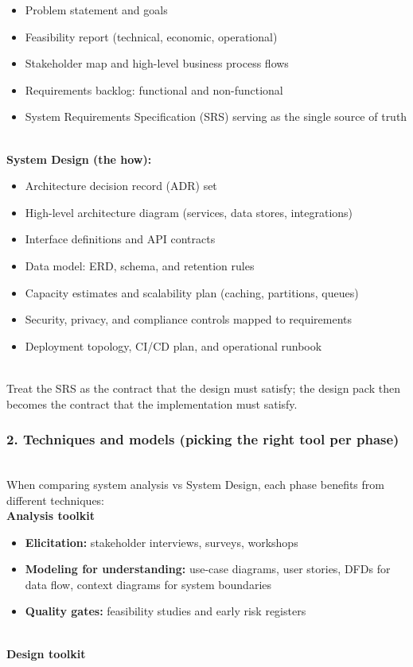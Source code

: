 \begin{itemize}
\item
Problem statement and goals
\item
Feasibility report (technical, economic, operational)
\item
Stakeholder map and high-level business process flows
\item
Requirements backlog: functional and non-functional
\item
System Requirements Specification (SRS) serving as the single source of truth
\end{itemize}
\\
\textbf{System Design (the how):}

\begin{itemize}
\item
Architecture decision record (ADR) set
\item
High-level architecture diagram (services, data stores, integrations)
\item
Interface definitions and API contracts
\item
Data model: ERD, schema, and retention rules
\item
Capacity estimates and scalability plan (caching, partitions, queues)
\item
Security, privacy, and compliance controls mapped to requirements
\item
Deployment topology, CI/CD plan, and operational runbook
\end{itemize}
\\
Treat the SRS as the contract that the design must satisfy; the design pack then becomes the contract that the implementation must satisfy.

\subsubsection{2. Techniques and models (picking the right tool per phase)}\label{techniques-and-models-picking-the-right-tool-per-phase}
\\
When comparing system analysis vs System Design, each phase benefits from different techniques:
\\
\textbf{Analysis toolkit}

\begin{itemize}
\item
\textbf{Elicitation:} stakeholder interviews, surveys, workshops
\item
\textbf{Modeling for understanding:} use-case diagrams, user stories, DFDs for data flow, context diagrams for system boundaries
\item
\textbf{Quality gates:} feasibility studies and early risk registers
\end{itemize}
\\
\textbf{Design toolkit}

